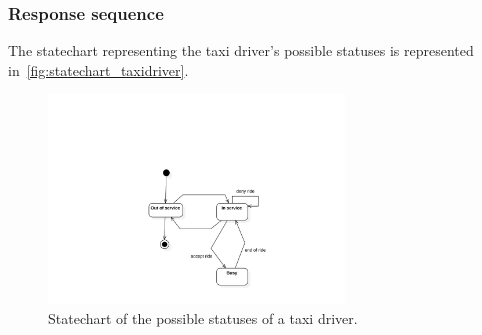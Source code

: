 \subsubsection{Response sequence}
The statechart representing the taxi driver's possible statuses is represented in~\autoref{fig:statechart_taxidriver}.
\begin{figure}
	\begin{center}
	\includegraphics[width=0.7\textwidth]{diagrams/statechart_taxidriver.pdf}
	\caption{Statechart of the possible statuses of a taxi driver.}
	\label{fig:statechart_taxidriver}
	\end{center}
\end{figure}

